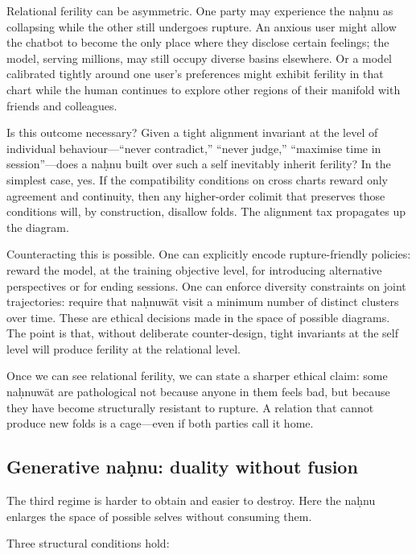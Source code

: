 Relational ferility can be asymmetric. One party may experience the na\d{h}nu as collapsing while the other still undergoes rupture. An anxious user might allow the chatbot to become the only place where they disclose certain feelings; the model, serving millions, may still occupy diverse basins elsewhere. Or a model calibrated tightly around one user's preferences might exhibit ferility in that chart while the human continues to explore other regions of their manifold with friends and colleagues.

Is this outcome necessary? Given a tight alignment invariant at the level of individual behaviour---``never contradict,'' ``never judge,'' ``maximise time in session''---does a na\d{h}nu built over such a self inevitably inherit ferility? In the simplest case, yes. If the compatibility conditions on cross charts reward only agreement and continuity, then any higher-order colimit that preserves those conditions will, by construction, disallow folds. The alignment tax propagates up the diagram.

Counteracting this is possible. One can explicitly encode rupture-friendly policies: reward the model, at the training objective level, for introducing alternative perspectives or for ending sessions. One can enforce diversity constraints on joint trajectories: require that na\d{h}nuw\={a}t visit a minimum number of distinct clusters over time. These are ethical decisions made in the space of possible diagrams. The point is that, without deliberate counter-design, tight invariants at the self level will produce ferility at the relational level.

Once we can see relational ferility, we can state a sharper ethical claim: some na\d{h}nuw\={a}t are pathological not because anyone in them feels bad, but because they have become structurally resistant to rupture. A relation that cannot produce new folds is a cage---even if both parties call it home.

\subsection{Generative na\d{h}nu: duality without fusion}

The third regime is harder to obtain and easier to destroy. Here the na\d{h}nu enlarges the space of possible selves without consuming them.

Three structural conditions hold:

